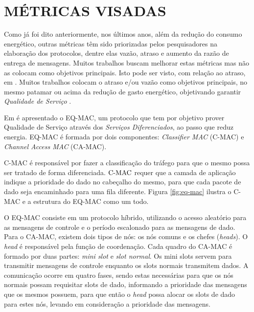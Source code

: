 \documentclass[12pt]{article}
\begin{document}
  \section{MÉTRICAS VISADAS}
  \label{metricas}

  Como já foi dito anteriormente, nos últimos anos, além da redução do consumo energético, outras métricas têm sido priorizadas pelos pesquisadores na elaboração dos protocolos, dentre elas vazão, atraso e aumento da razão de entrega de mensagens. Muitos trabalhos buscam melhorar estas métricas mas não as colocam como objetivos principais. Isto pode ser visto, com relação ao atraso, em \cite{20083811569004, 20102012936055, 20101312811704}. Muitos trabalhos colocam o atraso e/ou vazão como objetivos principais, no mesmo patamar ou acima da redução de gasto energético, objetivando garantir \textit{Qualidade de Serviço} \cite{20064010146973, 20102613043092, 20093112234782, 20093812310364, 20083811560517, 20083811569004, 20092612148942}.

  Em \cite{20092612148942} é apresentado o EQ-MAC, um protocolo que tem por objetivo prover Qualidade de Serviço através dos \textit{Serviços Diferenciados}, ao passo que reduz energia. EQ-MAC é formada por dois componentes: \textit{Classifier MAC} (C-MAC) e \textit{Channel Access MAC} (CA-MAC).

  C-MAC é responsável por fazer a classificação do tráfego para que o mesmo possa ser tratado de forma diferenciada. $\mbox{C-MAC}$ requer que a camada de aplicação indique a prioridade do dado no cabeçalho do mesmo, para que cada pacote de dado seja encaminhado para uma fila diferente. Figura \ref{fig:eq-mac} ilustra o C-MAC e a estrutura do EQ-MAC como um todo.

  O EQ-MAC consiste em um protocolo híbrido, utilizando o acesso aleatório para as mensagens de controle e o período escalonado para as mensagens de dado. Para o CA-MAC, existem dois tipos de nós: os nós comuns e os chefes (\textit{heads}). O \textit{head} é responsável pela função de coordenação. Cada quadro do CA-MAC é formado por duas partes: \emph{mini slot} e \emph{slot normal}. Os mini slots servem para transmitir mensagens de controle enquanto os slots normais transmitem dados. A comunicação ocorre em quatro fases, sendo estas necessárias para que os nós normais possam requisitar slots de dado, informando a prioridade das mensagens que os mesmos possuem, para que então o \textit{head} possa alocar os slots de dado para estes nós, levando em consideração a prioridade das mensagens.
\end{document}
